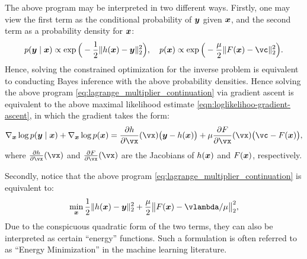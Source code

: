\documentclass[../../book-main.tex]{subfiles}
\begin{document}
The above program may be interpreted in two different ways. Firstly, one may view the first term as the conditional probability of $\bm{y}$ given $\bm{x}$, and the second term as a probability density for $\bm{x}$:
\begin{equation}
  p(\y\mid \x) \propto \exp\Big(- \frac{1}{2}\|h(\x) - \y\|_2^2\Big), \quad 
    p(\x) \propto \exp\Big( - \frac{\mu}{2}\|F(\x) - \vc\|_2^2\Big).
\end{equation} 
Hence, solving the constrained optimization for the inverse problem is equivalent to conducting Bayes inference with the above probability densities. Hence solving the above program \eqref{eq:lagrange_multiplier_continuation} via gradient ascent is equivalent to the above maximal likelihood estimate \eqref{eqn:loglikelihoo-gradient-ascent}, 
in which the gradient  takes the form:
\begin{equation}
   \nabla_{\x} \log p(\y \mid \x) + \nabla_{\x} \log p(\x)   =  \pdv{h}{\vx}(\vx)\big(\y - h(\x)\big) + \mu \pdv{F}{\vx}(\vx)\big(\vc - F(\x)\big),
\end{equation}
where $\pdv{h}{\vx}(\vx)$ and $\pdv{F}{\vx}(\vx)$ are the Jacobians of $h(\bm{x})$ and $F(\bm{x})$, respectively.

Secondly, notice that the above program \eqref{eq:lagrange_multiplier_continuation} is equivalent to:
\begin{equation}
\min_{\x} \frac{1}{2}\|h(\x) - \y\|_2^2 + \frac{\mu}{2} \big\|F(\x) - \vlambda/\mu\big\|_2^2,
\label{eqn:energy-minimization}
\end{equation} 
Due to the conspicuous quadratic form of the two terms, they can also be interpreted as certain ``energy'' functions. Such a formulation is often referred to as ``Energy Minimization'' in the machine learning literature.  

\end{document}
